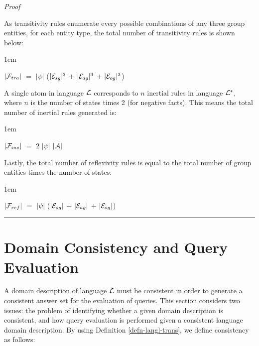 \documentclass[11pt]{report}
\newenvironment{vproof}
{
  \noindent
  {\em Proof}\hspace{0.5em}
}
{

  \noindent
  \rule{0.5em}{0.5em}
}
\newenvironment{vquote}
{
  \begin{list}{}{\leftmargin 1em}\item[]
}
{
  \end{list}
}
\begin{document}
\begin{vproof}
          As transitivity rules enumerate every possible combinations of any
          three group entities, for each entity type, the total number of
          transitivity rules is shown below:

          \begin{vquote}
            $|{\cal F}_{tra}|$ $=$
            $|\psi|$
            ($|{\cal E}_{sg}|^{3}$ $+$ $|{\cal E}_{ag}|^{3}$ $+$ $|{\cal E}_{og}|^{3}$)
          \end{vquote}

          A single atom in language ${\cal L}$ corresponds to $n$ inertial
          rules in language ${\cal L}^{*}$, where $n$ is the number of states
          times 2 (for negative facts). This means the total number of
          inertial rules generated is:

          \begin{vquote}
            $|{\cal F}_{ine}|$ $=$ $2$ $|\psi|$ $|{\cal A}|$
          \end{vquote}

          Lastly, the total number of reflexivity rules is equal to the total
          number of group entities times the number of states:

          \begin{vquote}
            $|{\cal F}_{ref}|$ $=$
            $|\psi|$
            ($|{\cal E}_{sg}|$ $+$ $|{\cal E}_{ag}|$ $+$ $|{\cal E}_{og}|$)
          \end{vquote}
        \end{vproof}

    \section{Domain Consistency and Query Evaluation}
      \label{sect-langl-consi}

      A domain description of language ${\cal L}$ must be consistent in order
      to generate a consistent answer set for the evaluation of queries. This
      section considers two issues: the problem of identifying whether a given
      domain description is consistent\footnotemark, and how query evaluation
      is performed given a consistent language domain description. By using
      Definition \ref{defn-langl-trans}, we define consistency as follows:

\end{document}
